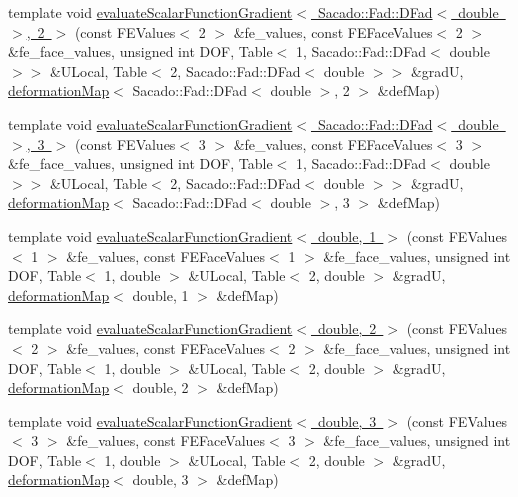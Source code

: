 \begin{DoxyCompactItemize}
\item 
template void \mbox{\hyperlink{function_evaluations_8cc_afe7a628ac86500a836308f5d73763eb9}{evaluate\+Scalar\+Function\+Gradient$<$ Sacado\+::\+Fad\+::\+D\+Fad$<$ double $>$, 2 $>$}} (const F\+E\+Values$<$ 2 $>$ \&fe\+\_\+values, const F\+E\+Face\+Values$<$ 2 $>$ \&fe\+\_\+face\+\_\+values, unsigned int D\+OF, Table$<$ 1, Sacado\+::\+Fad\+::\+D\+Fad$<$ double $>$$>$ \&U\+Local, Table$<$ 2, Sacado\+::\+Fad\+::\+D\+Fad$<$ double $>$$>$ \&gradU, \mbox{\hyperlink{structdeformation_map}{deformation\+Map}}$<$ Sacado\+::\+Fad\+::\+D\+Fad$<$ double $>$, 2 $>$ \&def\+Map)
\item 
template void \mbox{\hyperlink{function_evaluations_8cc_a28b649ef8b832ed57cd596b5a68d62c2}{evaluate\+Scalar\+Function\+Gradient$<$ Sacado\+::\+Fad\+::\+D\+Fad$<$ double $>$, 3 $>$}} (const F\+E\+Values$<$ 3 $>$ \&fe\+\_\+values, const F\+E\+Face\+Values$<$ 3 $>$ \&fe\+\_\+face\+\_\+values, unsigned int D\+OF, Table$<$ 1, Sacado\+::\+Fad\+::\+D\+Fad$<$ double $>$$>$ \&U\+Local, Table$<$ 2, Sacado\+::\+Fad\+::\+D\+Fad$<$ double $>$$>$ \&gradU, \mbox{\hyperlink{structdeformation_map}{deformation\+Map}}$<$ Sacado\+::\+Fad\+::\+D\+Fad$<$ double $>$, 3 $>$ \&def\+Map)
\item 
template void \mbox{\hyperlink{function_evaluations_8cc_a089c72529f691dcdbd062a644a861a93}{evaluate\+Scalar\+Function\+Gradient$<$ double, 1 $>$}} (const F\+E\+Values$<$ 1 $>$ \&fe\+\_\+values, const F\+E\+Face\+Values$<$ 1 $>$ \&fe\+\_\+face\+\_\+values, unsigned int D\+OF, Table$<$ 1, double $>$ \&U\+Local, Table$<$ 2, double $>$ \&gradU, \mbox{\hyperlink{structdeformation_map}{deformation\+Map}}$<$ double, 1 $>$ \&def\+Map)
\item 
template void \mbox{\hyperlink{function_evaluations_8cc_ad5e8e4a735ad40906adb7a5107748ea9}{evaluate\+Scalar\+Function\+Gradient$<$ double, 2 $>$}} (const F\+E\+Values$<$ 2 $>$ \&fe\+\_\+values, const F\+E\+Face\+Values$<$ 2 $>$ \&fe\+\_\+face\+\_\+values, unsigned int D\+OF, Table$<$ 1, double $>$ \&U\+Local, Table$<$ 2, double $>$ \&gradU, \mbox{\hyperlink{structdeformation_map}{deformation\+Map}}$<$ double, 2 $>$ \&def\+Map)
\item 
template void \mbox{\hyperlink{function_evaluations_8cc_a121295365acb762462c0f9812a5fc118}{evaluate\+Scalar\+Function\+Gradient$<$ double, 3 $>$}} (const F\+E\+Values$<$ 3 $>$ \&fe\+\_\+values, const F\+E\+Face\+Values$<$ 3 $>$ \&fe\+\_\+face\+\_\+values, unsigned int D\+OF, Table$<$ 1, double $>$ \&U\+Local, Table$<$ 2, double $>$ \&gradU, \mbox{\hyperlink{structdeformation_map}{deformation\+Map}}$<$ double, 3 $>$ \&def\+Map)

\end{DoxyCompactItemize}
